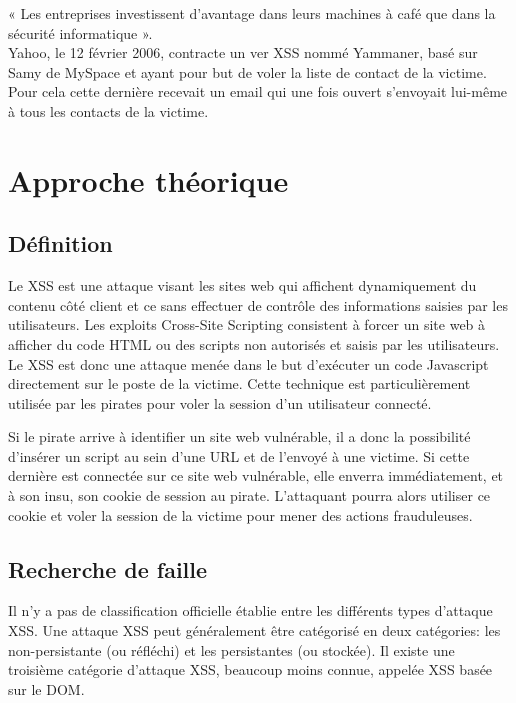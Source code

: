 \documentclass[a4paper,12pt]{report}
\begin{document}
« Les entreprises investissent d'avantage dans leurs machines à café que dans la sécurité informatique ».\\

Yahoo, le 12 février 2006, contracte un ver XSS nommé Yammaner, basé sur  Samy de MySpace et ayant pour but de voler la liste de contact de la victime. Pour cela cette dernière recevait un email qui une fois ouvert s’envoyait lui-même à tous les contacts de la victime.




    \newpage

  \chapter{Approche théorique} %
  \section{Définition}

  Le XSS est une attaque visant les sites web qui affichent dynamiquement du contenu côté client et ce sans effectuer de contrôle des informations saisies par les utilisateurs. Les exploits Cross-Site Scripting consistent à forcer un site web à afficher du code HTML ou des scripts non autorisés et saisis par les utilisateurs. Le XSS est donc une attaque menée dans le but d'exécuter un code Javascript directement sur le poste de la victime. Cette technique est particulièrement utilisée par les pirates pour voler la session d'un utilisateur connecté.

  Si le pirate arrive à identifier un site web vulnérable, il a donc la possibilité d’insérer un script au sein d’une URL et de l’envoyé à une victime. Si cette dernière est connectée sur ce site web vulnérable, elle enverra immédiatement, et à son insu, son cookie de session au pirate. L'attaquant pourra alors utiliser ce cookie et voler la session de la victime pour mener des actions frauduleuses.

    \newpage


  \section{Recherche de faille}



    \newpage

Il n'y a pas de classification officielle établie entre les différents types d'attaque XSS. Une attaque XSS peut généralement être catégorisé en deux catégories: les non-persistante (ou réfléchi) et les persistantes (ou stockée). Il existe une troisième catégorie d'attaque XSS, beaucoup moins connue, appelée XSS basée sur le DOM.
\end{document}
